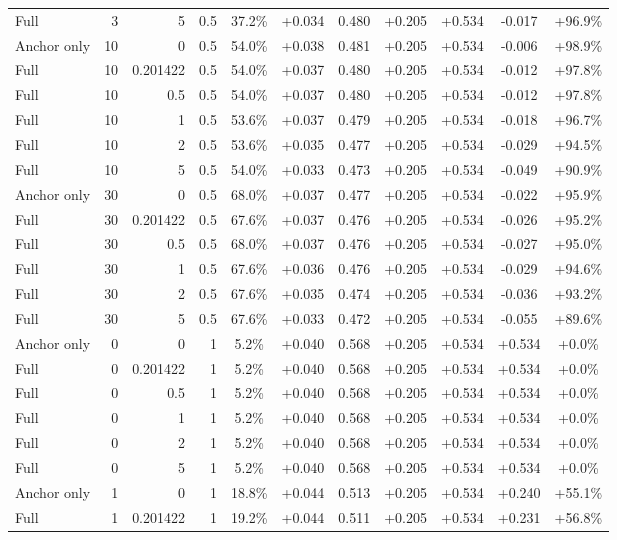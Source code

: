 \begin{table}[htbp]
\begin{tabular}{lrrrccccccc}
Full & 3 & 5 & 0.5 & 37.2\% & +0.034 & 0.480 & +0.205 & +0.534 & -0.017 & +96.9\% \\
Anchor only & 10 & 0 & 0.5 & 54.0\% & +0.038 & 0.481 & +0.205 & +0.534 & -0.006 & +98.9\% \\
Full & 10 & 0.201422 & 0.5 & 54.0\% & +0.037 & 0.480 & +0.205 & +0.534 & -0.012 & +97.8\% \\
Full & 10 & 0.5 & 0.5 & 54.0\% & +0.037 & 0.480 & +0.205 & +0.534 & -0.012 & +97.8\% \\
Full & 10 & 1 & 0.5 & 53.6\% & +0.037 & 0.479 & +0.205 & +0.534 & -0.018 & +96.7\% \\
Full & 10 & 2 & 0.5 & 53.6\% & +0.035 & 0.477 & +0.205 & +0.534 & -0.029 & +94.5\% \\
Full & 10 & 5 & 0.5 & 54.0\% & +0.033 & 0.473 & +0.205 & +0.534 & -0.049 & +90.9\% \\
Anchor only & 30 & 0 & 0.5 & 68.0\% & +0.037 & 0.477 & +0.205 & +0.534 & -0.022 & +95.9\% \\
Full & 30 & 0.201422 & 0.5 & 67.6\% & +0.037 & 0.476 & +0.205 & +0.534 & -0.026 & +95.2\% \\
Full & 30 & 0.5 & 0.5 & 68.0\% & +0.037 & 0.476 & +0.205 & +0.534 & -0.027 & +95.0\% \\
Full & 30 & 1 & 0.5 & 67.6\% & +0.036 & 0.476 & +0.205 & +0.534 & -0.029 & +94.6\% \\
Full & 30 & 2 & 0.5 & 67.6\% & +0.035 & 0.474 & +0.205 & +0.534 & -0.036 & +93.2\% \\
Full & 30 & 5 & 0.5 & 67.6\% & +0.033 & 0.472 & +0.205 & +0.534 & -0.055 & +89.6\% \\
Anchor only & 0 & 0 & 1 & 5.2\% & +0.040 & 0.568 & +0.205 & +0.534 & +0.534 & +0.0\% \\
Full & 0 & 0.201422 & 1 & 5.2\% & +0.040 & 0.568 & +0.205 & +0.534 & +0.534 & +0.0\% \\
Full & 0 & 0.5 & 1 & 5.2\% & +0.040 & 0.568 & +0.205 & +0.534 & +0.534 & +0.0\% \\
Full & 0 & 1 & 1 & 5.2\% & +0.040 & 0.568 & +0.205 & +0.534 & +0.534 & +0.0\% \\
Full & 0 & 2 & 1 & 5.2\% & +0.040 & 0.568 & +0.205 & +0.534 & +0.534 & +0.0\% \\
Full & 0 & 5 & 1 & 5.2\% & +0.040 & 0.568 & +0.205 & +0.534 & +0.534 & +0.0\% \\
Anchor only & 1 & 0 & 1 & 18.8\% & +0.044 & 0.513 & +0.205 & +0.534 & +0.240 & +55.1\% \\
Full & 1 & 0.201422 & 1 & 19.2\% & +0.044 & 0.511 & +0.205 & +0.534 & +0.231 & +56.8\% \\

\end{tabular}
\end{table}
